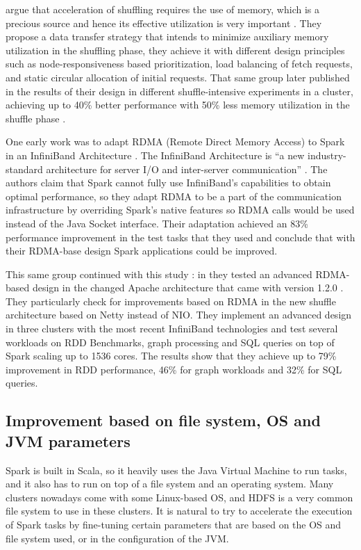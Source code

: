 \documentclass{article}
\begin{document}
\citeauthor{Nicolae2016} argue that acceleration of shuffling requires the use of memory, which is a precious source and hence its effective utilization is very important \cite{Nicolae2016}. They propose a data transfer strategy that intends to minimize auxiliary memory utilization in the shuffling phase, they achieve it with different design principles such as node-responsiveness based prioritization, load balancing of fetch requests, and static circular allocation of initial requests. That same group later published in \citeyear{nicolae2017leveraging} the results of their design in different shuffle-intensive experiments in a cluster, achieving up to 40\% better performance with 50\% less memory utilization in the shuffle phase \cite{nicolae2017leveraging}.

One early work was to adapt RDMA (Remote Direct Memory Access) to Spark in an InfiniBand Architecture \cite{Lu2014}. The InfiniBand Architecture is ``a new industry-standard architecture for server I/O and inter-server communication'' \cite{pfister2001introduction}. The authors claim that Spark cannot fully use InfiniBand's capabilities to obtain optimal performance, so they adapt RDMA to be a part of the communication infrastructure by overriding Spark's native features so RDMA calls would be used instead of the Java Socket interface. Their adaptation achieved an 83\% performance improvement in the test tasks that they used and conclude that with their RDMA-base design Spark applications could be improved.

This same group continued with this study \cite{Lu2016}: in \citeyear{Lu2016} they tested an advanced RDMA-based design in the changed Apache architecture that came with version 1.2.0 \cite{Armbrust2015}. They particularly check for improvements based on RDMA in the new shuffle architecture based on Netty instead of NIO. They implement an advanced design in three clusters with the most recent InfiniBand technologies and test several workloads on RDD Benchmarks, graph processing and SQL queries on top of Spark scaling up to 1536 cores. The results show that they achieve up to 79\% improvement in RDD performance, 46\% for graph workloads and 32\% for SQL queries. 

\subsection{Improvement based on file system, OS and JVM parameters}

Spark is built in Scala, so it heavily uses the Java Virtual Machine to run tasks, and it also has to run on top of a file system and an operating system. Many clusters nowadays come with some Linux-based OS, and HDFS is a very common file system to use in these clusters. It is natural to try to accelerate the execution of Spark tasks by fine-tuning certain parameters that are based on the OS and file system used, or in the configuration of the JVM.
\end{document}
